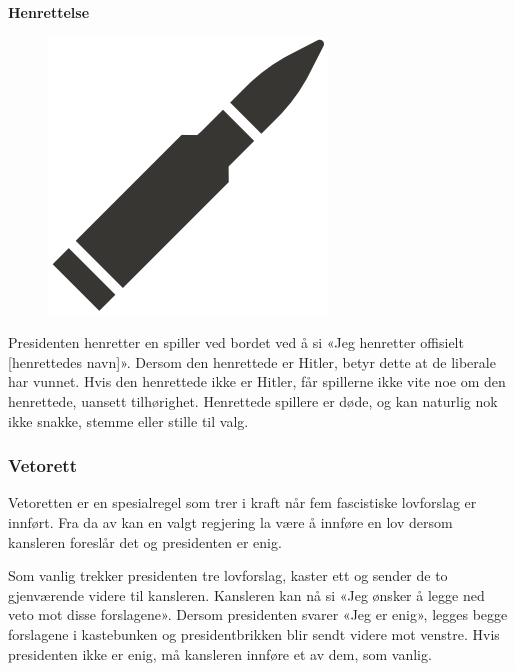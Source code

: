 \documentclass[a4paper, 10pt, twocolumn, twoside]{article}
\begin{document}
\textbf{Henrettelse}\\
\begin{figure}
\includegraphics[width=\linewidth]{./graphics/hitler_kniv}
\end{figure}
Presidenten henretter en spiller ved bordet ved å si «Jeg henretter offisielt [henrettedes navn]». Dersom den henrettede er Hitler, betyr dette at de liberale har vunnet. Hvis den henrettede ikke er Hitler, får spillerne ikke vite noe om den henrettede, uansett tilhørighet. Henrettede spillere er døde, og kan naturlig nok ikke snakke, stemme eller stille til valg.

\subsubsection{Vetorett}
Vetoretten er en spesialregel som trer i kraft når fem fascistiske lovforslag er innført. Fra da av kan en valgt regjering la være å innføre en lov dersom kansleren foreslår det og presidenten er enig. 

Som vanlig trekker presidenten tre lovforslag, kaster ett og sender de to gjenværende videre til kansleren. Kansleren kan nå si «Jeg ønsker å legge ned veto mot disse forslagene». Dersom presidenten svarer «Jeg er enig», legges begge forslagene i kastebunken og presidentbrikken blir sendt videre mot venstre. Hvis presidenten ikke er enig, må kansleren innføre et av dem, som vanlig. 
\end{document}
